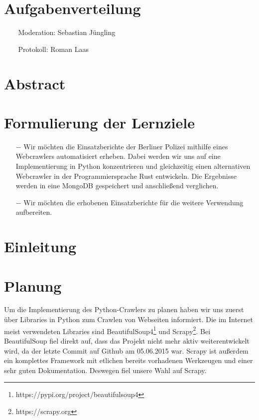\documentclass[chapterprefix=false, 12pt, a4paper, oneside, parskip=half, listof=totoc, bibliography=totoc, numbers=noendperiod]{scrbook}
\begin{document}
    \tableofcontents

    \chapter{Aufgabenverteilung}
\begin{itemize}
	\item[$$] Moderation: Sebastian Jüngling
	\item[$$] Protokoll: Roman Laas
\end{itemize}

    \chapter{Abstract}

    \chapter{Formulierung der Lernziele}

\begin{itemize}
\item[$-$] Wir möchten die Einsatzberichte der Berliner Polizei mithilfe eines Webcrawlers automatisiert erheben. Dabei werden wir uns auf eine Implementierung in Python konzentrieren und gleichzeitig einen alternativen Webcrawler in der Programmiersprache Rust entwickeln. Die Ergebnisse werden in eine MongoDB gespeichert und anschließend verglichen.
\item[$-$] Wir möchten die erhobenen Einsatzberichte für die weitere Verwendung aufbereiten.
\end{itemize}

	\chapter{Einleitung}

    \chapter{Planung}

    Um die Implementierung des Python-Crawlers zu planen haben wir uns zuerst über Libraries in Python zum Crawlen von Webseiten
    informiert. Die im Internet meist verwendeten Libraries sind BeautifulSoup4\footnote{https://pypi.org/project/beautifulsoup4}
    und Scrapy\footnote{https://scrapy.org}. Bei BeautifulSoup fiel direkt auf, dass das Projekt nicht mehr aktiv weiterentwickelt wird,
    da der letzte Commit auf Github am 05.06.2015 war. Scrapy ist außerdem ein komplettes Framework mit etlichen bereits vorhadenen
    Werkzeugen und einer sehr guten Dokumentation. Deswegen fiel unsere Wahl auf Scrapy.
\end{document}
